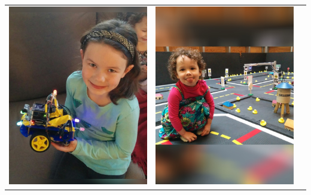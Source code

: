 \documentclass[landscape,a0paper,fontscale=0.292]{baposter}
\begin{document}
\begin{poster}
{\begin{center}
\begin{tabularx}{\linewidth}{X X X}
{\centering \includegraphics[width=0.8\linewidth]{greta.jpg}}&
{\centering \includegraphics[width=0.8\linewidth]{ingrid.jpg}}\\ 


\end{tabularx}
\end{center}}
\end{poster}
\end{document}
